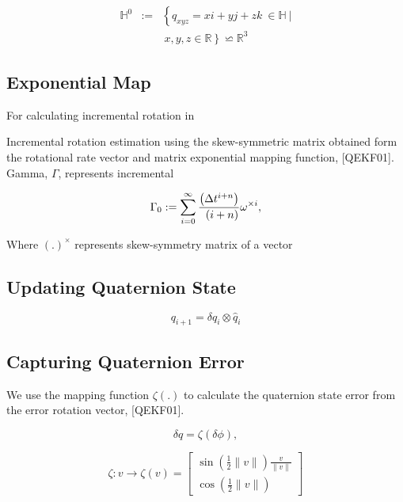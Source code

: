 \documentclass[letterpaper, 10 pt, conference]{ieeeconf}  %
\begin{document}
\begin{eqnarray}\nonumber
\label{eq:13}
\mathbb{H}^{0} &:=& \left\{ q_{xyz}=xi+yj+zk~ \in \mathbb{H}~| \right.\\
&& \left. ~x,y,z \in \mathbb{R} \right\} \backsimeq  \mathbb{R}^3
\end{eqnarray}



\subsection{Exponential Map}

For calculating incremental rotation in

Incremental rotation estimation using the skew-symmetric matrix obtained form
the rotational rate vector and matrix exponential mapping function, [QEKF01].
Gamma, $\Gamma$, represents incremental

\begin{equation}
\label{eq:14}
\Gamma_{0} := \sum_{i=0}^{\infty} \frac{ \left( \Delta t^{i+n}  \right)}{ \\
\left( i + n \right) \! } \\
\omega^{\times i},
\end{equation}

Where $(.)^{\times}$ represents skew-symmetry matrix of a vector


\subsection{Updating Quaternion State}
\begin{equation}
\label{eq:15}
q_{i+1} = \delta q_{i} \otimes \widehat{q}_{i}
\end{equation}



\subsection{Capturing Quaternion Error}
We use the mapping function $\zeta(.)$ to calculate the quaternion
state error from the error rotation vector, [QEKF01].

\begin{equation}
\label{eq:16}
\delta q = \zeta(\delta \phi),
\end{equation}

\begin{equation}
\label{eq:17}
\zeta : v \rightarrow \zeta(v) =
        \begin{bmatrix}
        \sin(\frac{1}{2}\|v\|) \frac{v}{\|v\|} \\
        \cos(\frac{1}{2}\|v\|)
        \end{bmatrix}
\end{equation}
\end{document}
